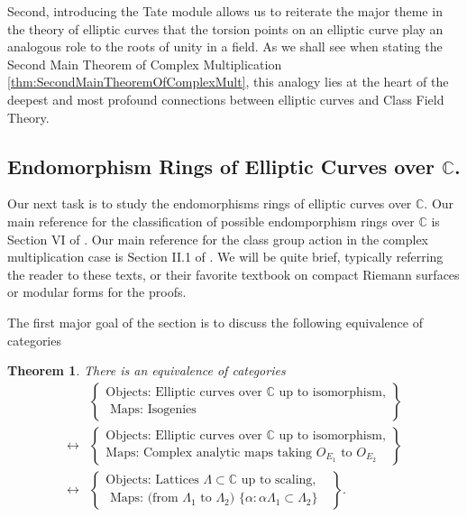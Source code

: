 \documentclass{amsart}
\newtheorem{thm}{Theorem}[section]
\theoremstyle{definition}
\theoremstyle{remark}
\numberwithin{equation}{section}
\newcommand{\bbC}{\mathbb C}
\begin{document}
 Second, introducing the Tate module allows us to reiterate the major theme in the theory of elliptic curves that the torsion points on an elliptic curve play an analogous role to the roots of unity in a field. As we shall see when stating the Second Main Theorem of Complex Multiplication \ref{thm:SecondMainTheoremOfComplexMult},
 this analogy lies at the heart of the deepest and most profound connections between elliptic curves and Class Field Theory. 
 
 
\subsection{Endomorphism Rings of Elliptic Curves over $\bbC$.} \label{subsec:EndRingsOverC}

 Our next task is to study the endomorphisms rings of elliptic curves over $\bbC$. Our main reference for the classification of possible endomporphism rings over $\bbC$ is Section VI of \cite{SilvermanAEC}. Our main reference for the class group action in the complex multiplication case is  Section II.1 of \cite{SilvermanATAEC}. We will be quite brief, typically referring the reader to these texts, or their favorite textbook on compact Riemann surfaces or modular forms for the proofs. %
 
 The first major goal of the section is to discuss the following equivalence of categories
 \begin{thm} \label{thm:EquivOfCategories}
 There is an equivalence of categories
 \begin{align*}
 &\left\{ \begin{array}{c} \text{Objects: Elliptic curves over $\bbC$ up to isomorphism,}\\
 \text{ Maps: Isogenies} \end{array}\right\}  \\
 \leftrightarrow &\left\{ 
 \begin{array}{c} \text{Objects: Elliptic curves over $\bbC$ up to isomorphism,}\\
 \text{Maps: Complex analytic maps taking $O_{E_{1}}$ to $O_{E_{2}}$}
 \end{array} 
 \right\} \\
  \leftrightarrow &\left\{ \begin{array}{c} \text{Objects: Lattices $\Lambda \subset \bbC$ up to scaling,}\\
 \text{ Maps: (from $\Lambda_{1}$ to $\Lambda_{2}$) $\{\alpha: \alpha \Lambda_{1} \subset \Lambda_{2}\}$ } \end{array} \right\}.
 \end{align*}
 \end{thm}
 
\end{document}
